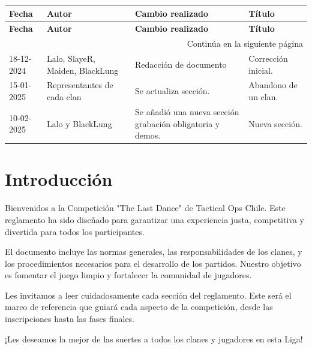 \documentclass[a4paper, 11pt]{article}
\begin{document}
    \begin{longtable}{|p{2.5cm}|p{3.5cm}|p{6cm}|p{3cm}|}
        \hline
        \textbf{Fecha} & \textbf{Autor} & \textbf{Cambio realizado} & \textbf{Título} \\
        \hline
        \endfirsthead
        
        \hline
        \textbf{Fecha} & \textbf{Autor} & \textbf{Cambio realizado} & \textbf{Título} \\
        \hline
        \endhead
    
        \hline
        \multicolumn{4}{|r|}{Continúa en la siguiente página} \\
        \hline
        \endfoot
    
        \hline
        \endlastfoot
    
        18-12-2024 & Lalo, SlayeR, Maiden, BlackLung & Redacción de documento & Corrección inicial. \\ 
        \hline
        15-01-2025 & Representantes de cada clan & Se actualiza sección.  & Abandono de un clan. \\ 
        \hline
        10-02-2025 & Lalo y BlackLung & Se añadió una nueva sección grabación obligatoria y demos. & Nueva sección. \\ 
        \hline
        
    \end{longtable}
    \clearpage


    
     \section{Introducción}
     Bienvenidos a la Competición "The Last Dance" de Tactical Ops Chile. Este reglamento ha sido diseñado para garantizar una experiencia justa, competitiva y divertida para todos los participantes.

    El documento incluye las normas generales, las responsabilidades de los clanes, y los procedimientos necesarios para el desarrollo de los partidos. Nuestro objetivo es fomentar el juego limpio y fortalecer la comunidad de jugadores.

    Les invitamos a leer cuidadosamente cada sección del reglamento. Este será el marco de referencia que guiará cada aspecto de la competición, desde las inscripciones hasta las fases finales.

    ¡Les deseamos la mejor de las suertes a todos los clanes y jugadores en esta Liga!
    \clearpage
\end{document}
